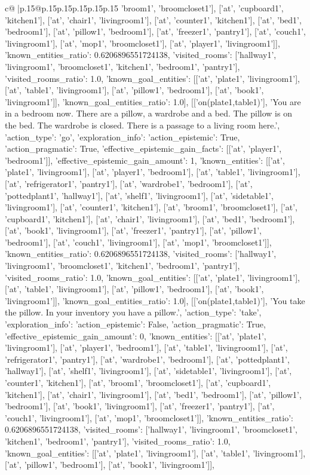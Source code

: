 \documentclass{article}
\begin{document}
{\begin{supertabular}{c@{$\;$}|p{.15\linewidth}@{}p{.15\linewidth}p{.15\linewidth}p{.15\linewidth}p{.15\linewidth}p{.15\linewidth}}
{{{'broom1', 'broomcloset1'], ['at', 'cupboard1', 'kitchen1'], ['at', 'chair1', 'livingroom1'], ['at', 'counter1', 'kitchen1'], ['at', 'bed1', 'bedroom1'], ['at', 'pillow1', 'bedroom1'], ['at', 'freezer1', 'pantry1'], ['at', 'couch1', 'livingroom1'], ['at', 'mop1', 'broomcloset1'], ['at', 'player1', 'livingroom1']], 'known_entities_ratio': 0.6206896551724138, 'visited_rooms': ['hallway1', 'livingroom1', 'broomcloset1', 'kitchen1', 'bedroom1', 'pantry1'], 'visited_rooms_ratio': 1.0, 'known_goal_entities': [['at', 'plate1', 'livingroom1'], ['at', 'table1', 'livingroom1'], ['at', 'pillow1', 'bedroom1'], ['at', 'book1', 'livingroom1']], 'known_goal_entities_ratio': 1.0}}], [['on(plate1,table1)'], 'You are in a bedroom now. There are a pillow, a wardrobe and a bed. The pillow is on the bed. The wardrobe is closed. There is a passage to a living room here.', {'action_type': 'go', 'exploration_info': {'action_epistemic': True, 'action_pragmatic': True, 'effective_epistemic_gain_facts': [['at', 'player1', 'bedroom1']], 'effective_epistemic_gain_amount': 1, 'known_entities': [['at', 'plate1', 'livingroom1'], ['at', 'player1', 'bedroom1'], ['at', 'table1', 'livingroom1'], ['at', 'refrigerator1', 'pantry1'], ['at', 'wardrobe1', 'bedroom1'], ['at', 'pottedplant1', 'hallway1'], ['at', 'shelf1', 'livingroom1'], ['at', 'sidetable1', 'livingroom1'], ['at', 'counter1', 'kitchen1'], ['at', 'broom1', 'broomcloset1'], ['at', 'cupboard1', 'kitchen1'], ['at', 'chair1', 'livingroom1'], ['at', 'bed1', 'bedroom1'], ['at', 'book1', 'livingroom1'], ['at', 'freezer1', 'pantry1'], ['at', 'pillow1', 'bedroom1'], ['at', 'couch1', 'livingroom1'], ['at', 'mop1', 'broomcloset1']], 'known_entities_ratio': 0.6206896551724138, 'visited_rooms': ['hallway1', 'livingroom1', 'broomcloset1', 'kitchen1', 'bedroom1', 'pantry1'], 'visited_rooms_ratio': 1.0, 'known_goal_entities': [['at', 'plate1', 'livingroom1'], ['at', 'table1', 'livingroom1'], ['at', 'pillow1', 'bedroom1'], ['at', 'book1', 'livingroom1']], 'known_goal_entities_ratio': 1.0}}], [['on(plate1,table1)'], 'You take the pillow. In your inventory you have a pillow.', {'action_type': 'take', 'exploration_info': {'action_epistemic': False, 'action_pragmatic': True, 'effective_epistemic_gain_amount': 0, 'known_entities': [['at', 'plate1', 'livingroom1'], ['at', 'player1', 'bedroom1'], ['at', 'table1', 'livingroom1'], ['at', 'refrigerator1', 'pantry1'], ['at', 'wardrobe1', 'bedroom1'], ['at', 'pottedplant1', 'hallway1'], ['at', 'shelf1', 'livingroom1'], ['at', 'sidetable1', 'livingroom1'], ['at', 'counter1', 'kitchen1'], ['at', 'broom1', 'broomcloset1'], ['at', 'cupboard1', 'kitchen1'], ['at', 'chair1', 'livingroom1'], ['at', 'bed1', 'bedroom1'], ['at', 'pillow1', 'bedroom1'], ['at', 'book1', 'livingroom1'], ['at', 'freezer1', 'pantry1'], ['at', 'couch1', 'livingroom1'], ['at', 'mop1', 'broomcloset1']], 'known_entities_ratio': 0.6206896551724138, 'visited_rooms': ['hallway1', 'livingroom1', 'broomcloset1', 'kitchen1', 'bedroom1', 'pantry1'], 'visited_rooms_ratio': 1.0, 'known_goal_entities': [['at', 'plate1', 'livingroom1'], ['at', 'table1', 'livingroom1'], ['at', 'pillow1', 'bedroom1'], ['at', 'book1', 'livingroom1']], }}}
\end{supertabular}}
\end{document}
